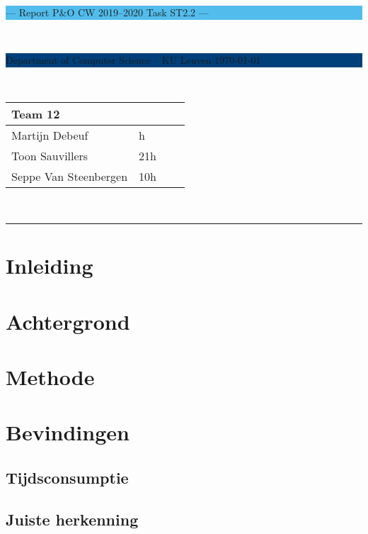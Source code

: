 \documentclass[a4paper,11pt]{article}
\begin{document}
\noindent
\colorbox[HTML]{52BDEC}{\bfseries\parbox{\textwidth}{\centering\large
  --- Report P\&O CW 2019--2020 Task ST2.2 ---
}}
\\[-1mm]
\colorbox[HTML]{00407A}{\bfseries\color{white}\parbox{\textwidth}{
  Department of Computer Science -- KU Leuven
  \hfill
  \today
}}
\\

\smallskip

\noindent
\begin{tabular}{*4l}
\toprule
\multicolumn{2}{l}{\large\textbf{Team 12}} \\
\midrule
Martijn Debeuf &  h\\ %
Toon Sauvillers &  21h\\
Seppe Van Steenbergen & 10h\\
\bottomrule
\hline
\end{tabular}\\

\noindent
{\color[HTML]{52BDEC} \rule{\linewidth}{1mm} }

\tableofcontents
\newpage
\section{Inleiding}\label{sec:inleiding}
	

\section{Achtergrond}\label{sec:achtergrond}

\section{Methode}\label{sec:methode}
	

\section{Bevindingen}\label{sec:bevindingen}
	

	\subsection{Tijdsconsumptie}\label{subsec:tijd}
		
	\subsection{Juiste herkenning}\label{subsec:juisteherkenning}
		
\end{document}
